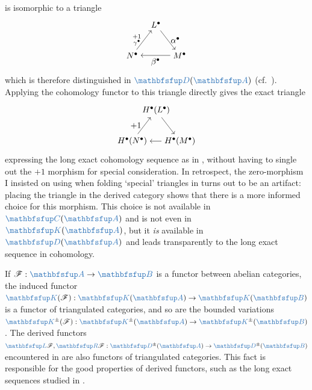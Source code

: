 is isomorphic to a triangle
\[
  \begin{tikzpicture}[baseline=(current bounding box.center)]
    \node (L) at (1,1.3)
    {$L^\bullet$}; \node (N) at (0,0)
    {$N^\bullet$}; \node (M) at (2,0)
    {$M^\bullet$}; \draw[->] (L) -- (M) node[midway, right]
    {$\alpha^\bullet$}; \draw[->] (M) -- (N) node[midway, below]
    {$\beta^\bullet$}; \draw[->] (N) -- (L) node[midway, left]
    {$\substack{+1\\\gamma^\bullet}$};
  \end{tikzpicture}
\]
which is therefore distinguished in $\categ{D}(\categ{A})$ (cf.\
). Applying
the cohomology functor to this triangle directly gives the exact
triangle
\[
  \begin{tikzpicture}[baseline=(current bounding box.center)]
    \node (L) at (1,1.3)
    {$H^\bullet(L^\bullet)$}; \node (N) at (0,0)
    {$H^\bullet(N^\bullet)$}; \node (M) at (2,0)
    {$H^\bullet(M^\bullet)$}; \draw[->] (L) -- (M); \draw[->] (M) --
    (N); \draw[->] (N) -- (L) node[midway, left] {$+1$};
  \end{tikzpicture}
\]
expressing the long exact cohomology sequence as in
, without having to single out the
$+1$ morphism for special consideration. In retrospect, the
zero-morphism I insisted on using when folding `special' triangles in
\Cref{subsec:homol:triangles} turns out to be an artifact: placing
the triangle in the derived category shows that there is a more
informed choice for this morphism. This choice is not available in
$\categ{C}(\categ{A})$ and is not even in $\categ{K}(\categ{A})$, but
it \emph{is} available in $\categ{D}(\categ{A})$ and leads
transparently to the long exact sequence in cohomology.

If $\mathscr{F} : \categ{A} \to \categ{B}$ is a functor between
abelian categories, the induced functor
$\categ{K}(\mathscr{F}) : \categ{K}(\categ{A}) \to
\categ{K}(\categ{B})$ is a functor of triangulated categories, and so
are the bounded variations
$\categ{K}^\pm(\mathscr{F}) : \categ{K}^\pm(\categ{A}) \to
\categ{K}^\pm(\categ{B})$. The derived functors
$\categ{L}\mathscr{F}, \categ{R}\mathscr{F} : \categ{D}^\pm(\categ{A})
\to \categ{D}^\pm(\categ{B})$ encountered in
 are
also functors of triangulated categories.  This fact is responsible
for the good properties of derived functors, such as the long exact
sequences studied in
.

